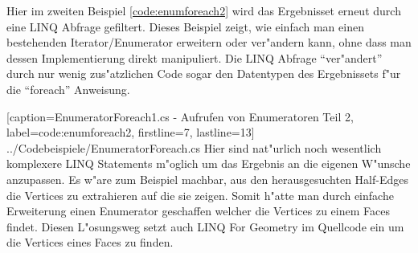 \documentclass[pagesize, paper=a4, fontsize=12pt,titlepage=true, headings=small, headnosepline, abstractoff, liststotoc, nochapterprefix, plainheadsepline]{scrreprt}
\newcommand{\LFGS}{LINQ For Geometry }
\begin{document}
Hier im zweiten Beispiel \ref{code:enumforeach2} wird das Ergebnisset erneut durch eine LINQ Abfrage gefiltert. Dieses Beispiel zeigt, wie einfach man einen bestehenden Iterator/Enumerator erweitern oder ver"andern kann, ohne dass man dessen Implementierung direkt manipuliert. Die LINQ Abfrage "`ver"andert"' durch nur wenig zus"atzlichen Code sogar den Datentypen des Ergebnissets f"ur die "`foreach"' Anweisung.

			[caption={EnumeratorForeach1.cs - Aufrufen von Enumeratoren Teil 2}, label=code:enumforeach2, firstline=7, lastline=13]
			{../Codebeispiele/EnumeratorForeach.cs}
Hier sind nat"urlich noch wesentlich komplexere LINQ Statements m"oglich um das Ergebnis an die eigenen W"unsche anzupassen. Es w"are zum Beispiel machbar, aus den herausgesuchten Half-Edges die Vertices zu extrahieren auf die sie zeigen. Somit h"atte man durch einfache Erweiterung einen Enumerator geschaffen welcher die Vertices zu einem Faces findet. Diesen L"osungsweg setzt auch \LFGS im Quellcode ein um die Vertices eines Faces zu finden.
\newline
\end{document}

